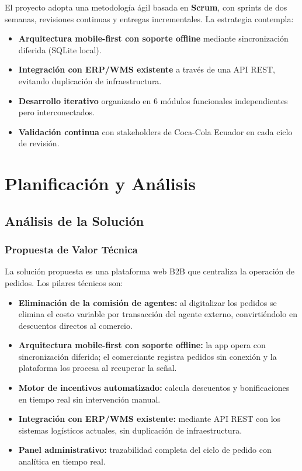 \documentclass[12pt, a4paper]{report}
\begin{document}
El proyecto adopta una metodología ágil basada en \textbf{Scrum}, con sprints de dos semanas, revisiones continuas y entregas incrementales. La estrategia contempla:

\begin{itemize}
  \item \textbf{Arquitectura mobile-first con soporte offline} mediante sincronización diferida (SQLite local).
  \item \textbf{Integración con ERP/WMS existente} a través de una API REST, evitando duplicación de infraestructura.
  \item \textbf{Desarrollo iterativo} organizado en 6 módulos funcionales independientes pero interconectados.
  \item \textbf{Validación continua} con stakeholders de Coca-Cola Ecuador en cada ciclo de revisión.
\end{itemize}

\chapter{Planificación y Análisis}

\section{Análisis de la Solución}

\subsection{Propuesta de Valor Técnica}

La solución propuesta es una plataforma web B2B que centraliza la operación de pedidos. Los pilares técnicos son:

\begin{itemize}
  \item \textbf{Eliminación de la comisión de agentes:} al digitalizar los pedidos se elimina el costo variable por transacción del agente externo, convirtiéndolo en descuentos directos al comercio.
  \item \textbf{Arquitectura mobile-first con soporte offline:} la app opera con sincronización diferida; el comerciante registra pedidos sin conexión y la plataforma los procesa al recuperar la señal.
  \item \textbf{Motor de incentivos automatizado:} calcula descuentos y bonificaciones en tiempo real sin intervención manual.
  \item \textbf{Integración con ERP/WMS existente:} mediante API REST con los sistemas logísticos actuales, sin duplicación de infraestructura.
  \item \textbf{Panel administrativo:} trazabilidad completa del ciclo de pedido con analítica en tiempo real.
\end{itemize}
\end{document}
